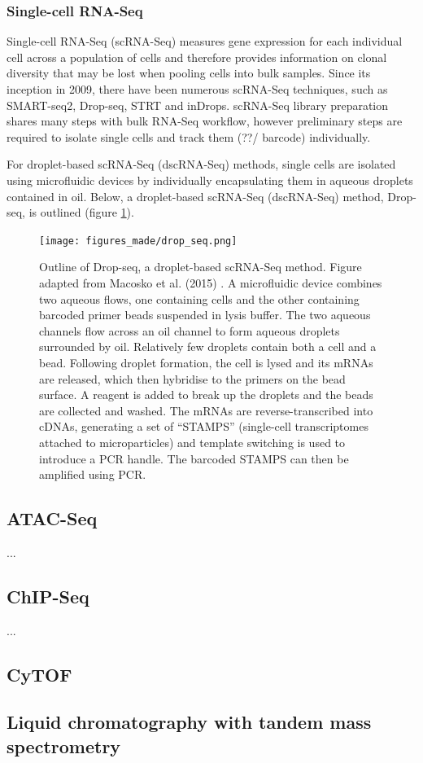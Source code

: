 
\subsubsection{Single-cell RNA-Seq}
Single-cell RNA-Seq (scRNA-Seq) measures gene expression for each individual cell across a population of cells and therefore provides information on clonal diversity that may be lost when pooling cells into bulk samples.
Since its inception in 2009\cite{tang2009mrna}, there have been numerous scRNA-Seq techniques, such as SMART-seq2\cite{picelli2013smart}, Drop-seq\cite{macosko2015highly}, STRT\cite{islam2011characterization} and inDrops\cite{klein2015droplet}.
scRNA-Seq library preparation shares many steps with bulk RNA-Seq workflow, however preliminary steps are required to isolate single cells and track them (??/ barcode) individually.

For droplet-based scRNA-Seq (dscRNA-Seq) methods, single cells are isolated using microfluidic devices by individually encapsulating them in aqueous droplets contained in oil.
Below, a droplet-based scRNA-Seq (dscRNA-Seq) method, Drop-seq, is outlined (figure \ref{fig:dropseq}).

\begin{figure}
\centering\texttt{[image: figures\_made/drop\_seq.png]}
\caption[Drop-seq schematic]{Outline of Drop-seq, a droplet-based scRNA-Seq method.
Figure adapted from Macosko et al. (2015) \cite{macosko2015highly}.
A microfluidic device combines two aqueous flows, one containing cells and the other containing barcoded primer beads suspended in lysis buffer.
The two aqueous channels flow across an oil channel to form aqueous droplets surrounded by oil.
Relatively few droplets contain both a cell and a bead.
Following droplet formation, the cell is lysed and its mRNAs are released, which then hybridise to the primers on the bead surface.
A reagent is added to break up the droplets and the beads are collected and washed.
The mRNAs are reverse-transcribed into cDNAs, generating a set of ``STAMPS'' (single-cell transcriptomes attached to microparticles) and template switching is used to introduce a PCR handle.
The barcoded STAMPS can then be amplified using PCR.}
\label{fig:dropseq}\end{figure}


\subsection{ATAC-Seq}
...

\subsection{ChIP-Seq}
...

\subsection{CyTOF}

\subsection{Liquid chromatography with tandem mass spectrometry}

\section{}